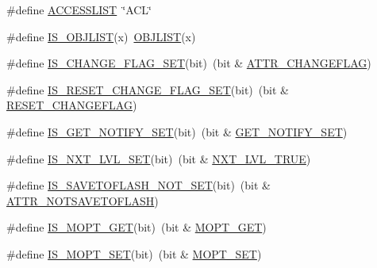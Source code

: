 \begin{DoxyCompactItemize}
\item 
\#define \hyperlink{group__LIBHELP_ga449d3babf595d8210dbb578ac66aa0f4}{A\-C\-C\-E\-S\-S\-L\-I\-S\-T}~\char`\"{}A\-C\-L\char`\"{}
\item 
\#define \hyperlink{group__LIBHELP_ga6e3ff99394385544686d23c7e6f52922}{I\-S\-\_\-\-O\-B\-J\-L\-I\-S\-T}(x)~\hyperlink{group__LIBHELP_ga62f1164f5252ae6639d85d5dea956f7d}{O\-B\-J\-L\-I\-S\-T}(x)
\item 
\#define \hyperlink{group__LIBHELP_gabf3a0a06fd326265c81d121ce46bfa03}{I\-S\-\_\-\-C\-H\-A\-N\-G\-E\-\_\-\-F\-L\-A\-G\-\_\-\-S\-E\-T}(bit)~(bit \& \hyperlink{group__LIBHELP_gga394c61369f4e995f18b58c77d1a3cccba45fd68ac3d5bebe5d404f59979f37f77}{A\-T\-T\-R\-\_\-\-C\-H\-A\-N\-G\-E\-F\-L\-A\-G})
\item 
\#define \hyperlink{group__LIBHELP_ga6e742b603e7e29b084576318b0a020b0}{I\-S\-\_\-\-R\-E\-S\-E\-T\-\_\-\-C\-H\-A\-N\-G\-E\-\_\-\-F\-L\-A\-G\-\_\-\-S\-E\-T}(bit)~(bit \& \hyperlink{group__LIBHELP_gga269cc0b81be50f8be29bcdbc1706fd64a661789419acf60aeefd2833e82a4f7d3}{R\-E\-S\-E\-T\-\_\-\-C\-H\-A\-N\-G\-E\-F\-L\-A\-G})
\item 
\#define \hyperlink{group__LIBHELP_ga174cd2a0aa09bd0719d10363c77a7945}{I\-S\-\_\-\-G\-E\-T\-\_\-\-N\-O\-T\-I\-F\-Y\-\_\-\-S\-E\-T}(bit)~(bit \& \hyperlink{group__LIBHELP_gga269cc0b81be50f8be29bcdbc1706fd64ab8845fa48ccfd17f5be8ada997a0d859}{G\-E\-T\-\_\-\-N\-O\-T\-I\-F\-Y\-\_\-\-S\-E\-T})
\item 
\#define \hyperlink{group__LIBHELP_gaadf4b1ce4c6607378f43026cda70db48}{I\-S\-\_\-\-N\-X\-T\-\_\-\-L\-V\-L\-\_\-\-S\-E\-T}(bit)~(bit \& \hyperlink{group__LIBHELP_gga269cc0b81be50f8be29bcdbc1706fd64a179ba6308a0a84adff2b27c5b0716fc0}{N\-X\-T\-\_\-\-L\-V\-L\-\_\-\-T\-R\-U\-E})
\item 
\#define \hyperlink{group__LIBHELP_ga6c17740b104fd0c96770bc3a361af7d2}{I\-S\-\_\-\-S\-A\-V\-E\-T\-O\-F\-L\-A\-S\-H\-\_\-\-N\-O\-T\-\_\-\-S\-E\-T}(bit)~(bit \& \hyperlink{group__LIBHELP_gga394c61369f4e995f18b58c77d1a3cccba93fb968d56ea0dc63666d8372b8e35cb}{A\-T\-T\-R\-\_\-\-N\-O\-T\-S\-A\-V\-E\-T\-O\-F\-L\-A\-S\-H})
\item 
\#define \hyperlink{group__LIBHELP_gae96ab4238bdf72184e563254c5da0e23}{I\-S\-\_\-\-M\-O\-P\-T\-\_\-\-G\-E\-T}(bit)~(bit \& \hyperlink{group__LIBHELP_gga0cdba030aaa0bd18b24dbf19b06877a0aa2e0913dec5e220b92f791525e132735}{M\-O\-P\-T\-\_\-\-G\-E\-T})
\item 
\#define \hyperlink{group__LIBHELP_ga4e056b9d4e57e37e0c9af6cd5b8ef7f4}{I\-S\-\_\-\-M\-O\-P\-T\-\_\-\-S\-E\-T}(bit)~(bit \& \hyperlink{group__LIBHELP_gga0cdba030aaa0bd18b24dbf19b06877a0ac23667be630f90a58d53d02b11d7340f}{M\-O\-P\-T\-\_\-\-S\-E\-T})

\end{DoxyCompactItemize}
